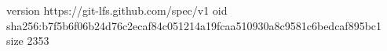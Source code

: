 version https://git-lfs.github.com/spec/v1
oid sha256:b7f5b6f06b24d76c2ecaf84c051214a19fcaa510930a8c9581c6bedcaf895bc1
size 2353
